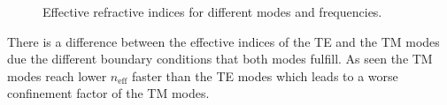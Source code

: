 \begin{figure}[h]%
\centering
\caption{Effective refractive indices for different modes and frequencies.}%
\label{fig:1_neff}%
\end{figure}

There is a difference between the effective indices of the TE and the TM modes due the different boundary conditions that both modes fulfill. As seen the TM modes reach lower $n_{\mathrm{eff}}$ faster than the TE modes which leads to a worse confinement factor of the TM modes.

